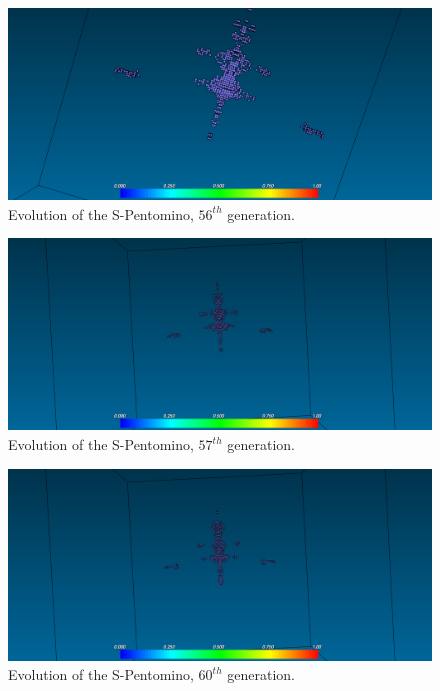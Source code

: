 \begin{figure}
	\centering
	\includegraphics[scale=0.3]{pentominoes_ss/s_56.png}
	\caption{Evolution of the S-Pentomino, $56^{th}$ generation.}
  \label{fig:ss-pent:s-56}
\end{figure}

\begin{figure}
	\centering
	\includegraphics[scale=0.3]{pentominoes_ss/s_57.png}
	\caption{Evolution of the S-Pentomino, $57^{th}$ generation.}
  \label{fig:ss-pent:s-57}
\end{figure}

\begin{figure}
	\centering
	\includegraphics[scale=0.3]{pentominoes_ss/s_60.png}
	\caption{Evolution of the S-Pentomino, $60^{th}$ generation.}
  \label{fig:ss-pent:s-59}
\end{figure}

